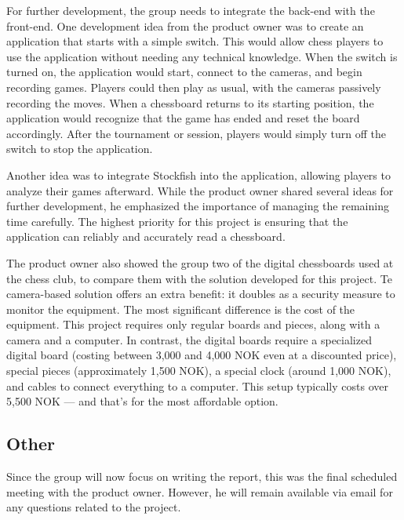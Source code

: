 For further development, the group needs to integrate the back-end with the front-end. One development idea from the product owner was to create an application that starts with a simple switch. This would allow chess players to use the application without needing any technical knowledge. When the switch is turned on, the application would start, connect to the cameras, and begin recording games. Players could then play as usual, with the cameras passively recording the moves. When a chessboard returns to its starting position, the application would recognize that the game has ended and reset the board accordingly. After the tournament or session, players would simply turn off the switch to stop the application.

Another idea was to integrate Stockfish into the application, allowing players to analyze their games afterward. While the product owner shared several ideas for further development, he emphasized the importance of managing the remaining time carefully. The highest priority for this project is ensuring that the application can reliably and accurately read a chessboard.

The product owner also showed the group two of the digital chessboards used at the chess club, to compare them with the solution developed for this project. Te camera-based solution offers an extra benefit: it doubles as a security measure to monitor the equipment. The most significant difference is the cost of the equipment. This project requires only regular boards and pieces, along with a camera and a computer. In contrast, the digital boards require a specialized digital board (costing between 3,000 and 4,000 NOK even at a discounted price), special pieces (approximately 1,500 NOK), a special clock (around 1,000 NOK), and cables to connect everything to a computer. This setup typically costs over 5,500 NOK — and that’s for the most affordable option. 

\subsection{Other} 
Since the group will now focus on writing the report, this was the final scheduled meeting with the product owner. However, he will remain available via email for any questions related to the project.